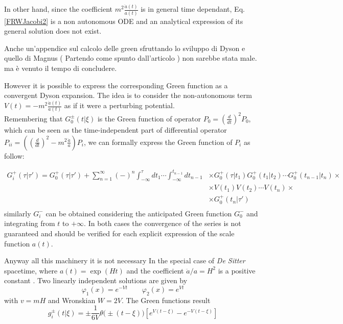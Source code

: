 \documentclass[Main]{subfiles}
\begin{document}
			In other hand, since the coefficient $m^2 \frac{\ddot{a}(t)}{a(t)}$ is in general time dependant,  Eq. \ref{FRWJacobi2} is a non autonomous ODE and an analytical expression of its general solution does not exist.
\ifToninus
	\begin{Warning}	
		Anche un'appendice sul calcolo delle green sfruttando lo sviluppo di Dyson e quello di Magnus ( Partendo come spunto dall'articolo \cite{Dappiaggi2014}) non sarebbe stata male. ma è venuto il tempo di concludere.
	\end{Warning}
\fi	
			However it is possible to express the corresponding Green function as a convergent Dyson expansion\cite{Dappiaggi2014}.
			The idea is to consider the non-autonomous term $V(t) = -m^2 \frac{\ddot{a}(t)}{a(t)}$ as if it were a perturbing potential.\\
			Remembering that $G^\pm_0 (t \vert \xi)$ is the Green function of operator \ifToninus$P_{0}=\left(\frac{d}{dt}\right)^2$\else$P_0$\fi, which can be seen as the time-independent part of differential operator \ifToninus$P_{i i}=\left( \left(\frac{d}{dt}\right)^2 - m^2 \frac{\ddot{a}}{a} \right)$\else$P_i$\fi, we can formally express the Green function of $P_{i}$ as follow:
			
			\begin{align*}
				G^+_i ( \tau \vert \tau' ) = G^+_0( \tau \vert \tau' ) + \sum_{n=1}^\infty (-)^n 
				\int_{-\infty}^\tau dt_1 \cdots \int_{-\infty}^{t_{n-1}} dt_{n-1} 
				& \times	  G^+_0(\tau \vert t_1) G^+_0(t_1\vert t_2) \cdots G^+_0(t_{n-1} \vert t_n) \times \\
				& \times  V(t_1) V(t_2) \cdots V(t_n) \times \\
				& \times  G^+_0 (t_n \vert \tau' ) \\
			\end{align*}		
			similarly $G^-_i$  can be obtained considering the anticipated Green function $G^-_0$ and integrating from $t$ to $+\infty$.
			In both cases the convergence of the series is not guaranteed and should be verified for each explicit expression of the scale function $a (t)$.
			
			\vspace{2mm}
			\ifToninus Anyway all this machinery it is not necessary \fi In the special case of \emph{De Sitter} spacetime, where $ a(t) = \exp(H t)$ and the coefficient $\ddot{a}/a=H^2$ is a positive constant  \cite{Wald1984}.
			Two linearly independent solutions are given by
			\begin{displaymath}
				\varphi_1(x) = e^{-V t} \qquad \varphi_2(x)= e^{Vt}
			\end{displaymath}
			with $v=m H$ and Wronskian $W= 2V$.
			The Green functions result
			\begin{displaymath}
								g^\pm_i(t \vert \xi) = \pm \frac{1}{6V}\theta\big(\pm(t-\xi)\big) \left[ e^{V(t-\xi)} - e^{-V(t-\xi)}\right]
			\end{displaymath}
\end{document}
